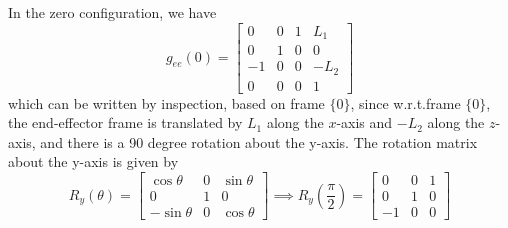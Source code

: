 In the zero configuration, we have
\begin{equation*}
    \boxed{
        g_{e e}(0)
        =
        \begin{bmatrix}
            0  & 0 & 1 & L_1  \\
            0  & 1 & 0 & 0    \\
            -1 & 0 & 0 & -L_2 \\
            0  & 0 & 0 & 1
        \end{bmatrix}
    }
\end{equation*}
which can be written by inspection, based on frame \( \{0\} \), since w.r.t.\@ frame \( \{0\} \), the end-effector frame is translated by \( L_1 \) along the \( x \)-axis and \( -L_2 \) along the \( z \)-axis, and there is a 90 degree rotation about the y-axis. The rotation matrix about the y-axis is given by
\begin{equation*}
    R_y(\theta)
    =
    \begin{bmatrix}
        \cos \theta  & 0 & \sin \theta \\
        0            & 1 & 0           \\
        -\sin \theta & 0 & \cos \theta
    \end{bmatrix}
    \implies
    R_y\left(\frac{\pi}{2}\right)
    =
    \begin{bmatrix}
        0  & 0 & 1 \\
        0  & 1 & 0 \\
        -1 & 0 & 0
    \end{bmatrix}
\end{equation*}
